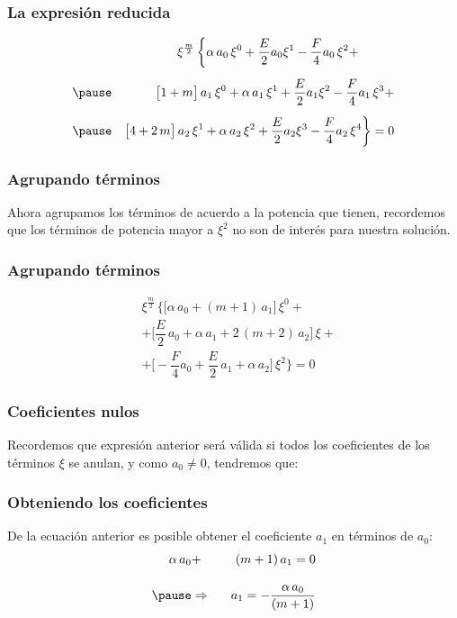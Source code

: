 \documentclass[12pt]{beamer}
\begin{document}
\begin{frame}
\frametitle{La expresión reducida}
\begin{eqnarray*}
&{}& \xi^{\frac{m}{2}} \, \bigg\{ \alpha \, a_{0} \, \xi^{0} + \dfrac{E}{2} a_{0} \xi^{1} - \dfrac{F}{4} a_{0} \, \xi^{2} + \hspace{1cm} \\[0.5em] \pause
&{}& \big[ 1 + m \big] \, a_{1} \, \xi^{0} + \alpha \, a_{1} \, \xi^{1} + \dfrac{E}{2} a_{1} \xi^{2} - \dfrac{F}{4} a_{1} \, \xi^{3} + \\[0.5em] \pause
&{}& \big[ 4 + 2 \, m \big] \, a_{2} \, \xi^{1} + \alpha \, a_{2} \, \xi^{2} + \dfrac{E}{2} a_{2} \xi^{3} - \dfrac{F}{4} a_{2} \, \xi^{4} \bigg\} = 0
\end{eqnarray*}
\end{frame}
\begin{frame}
\frametitle{Agrupando términos}
Ahora agrupamos los términos de acuerdo a la potencia que tienen, recordemos que los términos de potencia mayor a $\xi^{2}$ no son de interés para nuestra solución.
\end{frame}
\begin{frame}
\frametitle{Agrupando términos}
\vspace*{-1cm}
\begin{align*}
&{} \xi^{\frac{m}{2}} \, \bigg\{ \bigg[ \alpha \, a_{0} + (m + 1) \, a_{1} \bigg]  \, \xi^{0} + \\[0.5em]
&+ \bigg[ \dfrac{E}{2} \, a_{0} + \alpha \, a_{1} + 2 \, (m + 2) \, a_{2} \bigg] \,  \xi + \\[0.5em]
&+ \bigg[ - \dfrac{F}{4} a_{0} + \dfrac{E}{2} \, a_{1} + \alpha \, a_{2} \bigg] \, \xi^{2} \bigg\}= 0
\end{align*}
\end{frame}
\begin{frame}
\frametitle{Coeficientes nulos}
Recordemos que expresión anterior será válida si todos los coeficientes de los términos $\xi$ se anulan, y como $a_{0} \neq 0$, tendremos que:
\end{frame}
\begin{frame}
\frametitle{Obteniendo los coeficientes}
De la ecuación anterior es posible obtener el coeficiente $a_{1}$ en términos de $a_{0}$:
\begin{eqnarray*}
\alpha \, a_{0} &+& (m + 1) \, a_{1} = 0 \\[1em] \pause
&\Rightarrow& \hspace{0.3cm} a_{1} = - \dfrac{\alpha \, a_{0}}{(m + 1)}
\end{eqnarray*}
\end{frame}
\end{document}
